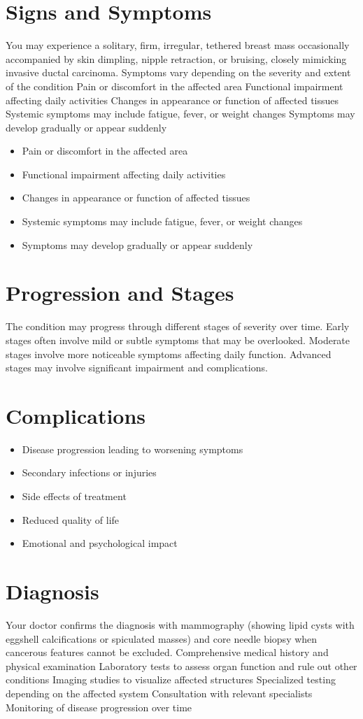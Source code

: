\section{Signs and Symptoms}
You may experience a solitary, firm, irregular, tethered breast mass occasionally accompanied by skin dimpling, nipple retraction, or bruising, closely mimicking invasive ductal carcinoma. Symptoms vary depending on the severity and extent of the condition Pain or discomfort in the affected area Functional impairment affecting daily activities Changes in appearance or function of affected tissues Systemic symptoms may include fatigue, fever, or weight changes Symptoms may develop gradually or appear suddenly

\begin{itemize}[noitemsep]
  \item Pain or discomfort in the affected area
  \item Functional impairment affecting daily activities
  \item Changes in appearance or function of affected tissues
  \item Systemic symptoms may include fatigue, fever, or weight changes
  \item Symptoms may develop gradually or appear suddenly
\end{itemize}
\section{Progression and Stages}
The condition may progress through different stages of severity over time. Early stages often involve mild or subtle symptoms that may be overlooked. Moderate stages involve more noticeable symptoms affecting daily function. Advanced stages may involve significant impairment and complications.
\section{Complications}
\begin{itemize}[noitemsep]
  \item Disease progression leading to worsening symptoms
  \item Secondary infections or injuries
  \item Side effects of treatment
  \item Reduced quality of life
  \item Emotional and psychological impact
\end{itemize}
\section{Diagnosis}
Your doctor confirms the diagnosis with mammography (showing lipid cysts with eggshell calcifications or spiculated masses) and core needle biopsy when cancerous features cannot be excluded. Comprehensive medical history and physical examination Laboratory tests to assess organ function and rule out other conditions Imaging studies to visualize affected structures Specialized testing depending on the affected system Consultation with relevant specialists Monitoring of disease progression over time

